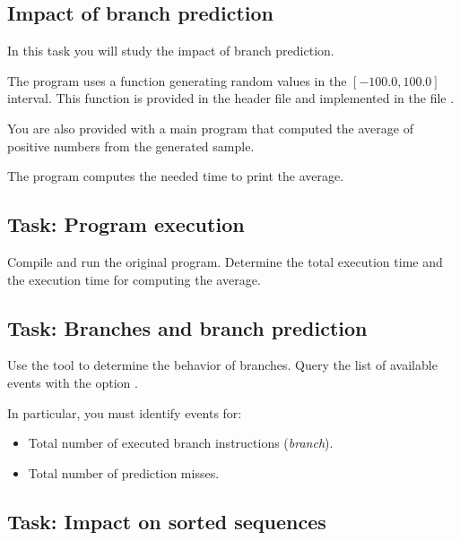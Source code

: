 \clearpage
\subsection{Impact of branch prediction}

In this task you will study the impact of branch prediction.

The program uses a function generating random values in the $[-100.0, 100.0]$ interval. 
This function is provided in the header file  
and implemented in the file .





You are also provided with a main program that computed the average of 
positive numbers from the generated sample.



The program computes the needed time to print the average.

\subsection{Task: Program execution}

Compile and run the original program. Determine the total execution time and 
the execution time for computing the average.

\subsection{Task: Branches and branch prediction}

Use the  tool to determine the behavior of branches.
Query the list of available events with the option .

In particular, you must identify events for:
\begin{itemize}
  \item Total number of executed branch instructions (\emph{branch}).
  \item Total number of prediction misses.
\end{itemize}

\subsection{Task: Impact on sorted sequences}

